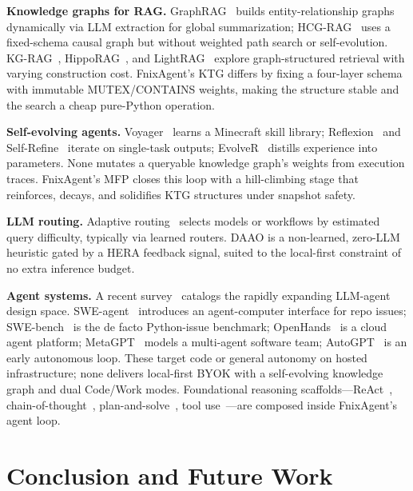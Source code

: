 \documentclass[sigconf]{acmart}
\begin{document}
\textbf{Knowledge graphs for RAG.} GraphRAG~\cite{edge2024graphrag} builds entity-relationship graphs dynamically via LLM extraction for global summarization; HCG-RAG~\cite{hcg2026} uses a fixed-schema causal graph but without weighted path search or self-evolution. KG-RAG~\cite{soman2024kgrag}, HippoRAG~\cite{gutierrez2024hipporag}, and LightRAG~\cite{guo2024lightrag} explore graph-structured retrieval with varying construction cost. FnixAgent's KTG differs by fixing a four-layer schema with immutable MUTEX/CONTAINS weights, making the structure stable and the search a cheap pure-Python operation.

\textbf{Self-evolving agents.} Voyager~\cite{wang2023voyager} learns a Minecraft skill library; Reflexion~\cite{shinn2023reflexion} and Self-Refine~\cite{madaan2023selfrefine} iterate on single-task outputs; EvolveR~\cite{xu2026evolver} distills experience into parameters. None mutates a queryable knowledge graph's weights from execution traces. FnixAgent's MFP closes this loop with a hill-climbing stage that reinforces, decays, and solidifies KTG structures under snapshot safety.

\textbf{LLM routing.} Adaptive routing~\cite{pham2025bestroute,router2025r1} selects models or workflows by estimated query difficulty, typically via learned routers. DAAO is a non-learned, zero-LLM heuristic gated by a HERA feedback signal, suited to the local-first constraint of no extra inference budget.

\textbf{Agent systems.} A recent survey~\cite{guo2024survey} catalogs the rapidly expanding LLM-agent design space. SWE-agent~\cite{yang2024sweagent} introduces an agent-computer interface for repo issues; SWE-bench~\cite{jimenez2024swebench} is the de facto Python-issue benchmark; OpenHands~\cite{wang2024openhands} is a cloud agent platform; MetaGPT~\cite{hong2023metagpt} models a multi-agent software team; AutoGPT~\cite{sig2023autogpt} is an early autonomous loop. These target code or general autonomy on hosted infrastructure; none delivers local-first BYOK with a self-evolving knowledge graph and dual Code/Work modes. Foundational reasoning scaffolds---ReAct~\cite{yao2023react}, chain-of-thought~\cite{wei2022cot}, plan-and-solve~\cite{wang2023plansolve}, tool use~\cite{schick2024toolformer,qin2024toolllm}---are composed inside FnixAgent's agent loop.

\section{Conclusion and Future Work}\label{sec:concl}
\end{document}
